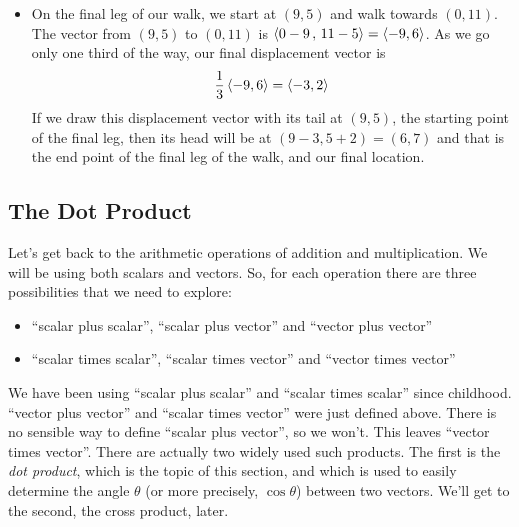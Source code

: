\begin{eg}
\begin{itemize}
$\sqrt{1^2+1^2}=\sqrt{2}$ and so $\frac{\llt 1,1\rgt}{\sqrt{2}}$ has length one
and our displacement vector is
\begin{equation*}
5\sqrt{2}\ \frac{\llt 1,1\rgt}{\sqrt{2}}
=5 \llt 1,1\rgt 
=\llt 5,5\rgt
\end{equation*}
If we draw this displacement vector, $\llt 5,5\rgt$ with its tail at 
$(4,0)$, the starting point of the second leg of the walk, then its head 
will be at $(4+5, 0+5)=(9,5)$ and that is the end point of the second 
leg of the walk.
\item
On the final leg of our walk, we start at $(9,5)$ and walk towards $(0,11)$.
The vector from $(9,5)$ to $(0,11)$ is $\left< 0-9\,,\,11-5\right> =\left< -9,6\right>$.
As we go only one third of the way, our final displacement vector is
\begin{equation*}
\frac{1}{3}\left< -9,6\right>
=\left< -3,2\right>
\end{equation*}
If we draw this displacement vector with its tail at 
$(9,5)$, the starting point of the final leg, then its head 
will be at $(9-3, 5+2)=(6,7)$ and that is the end point of the final
leg of the walk, and our final location.
\end{itemize}
\end{eg}

\subsection{The Dot Product}\label{subsec dot product}
Let's get back to the arithmetic operations of addition and multiplication.
We will be using both scalars and vectors. So, for each operation there are 
three possibilities that we need to explore: 
\begin{itemize}\itemsep1pt \parskip0pt 
\item ``scalar plus scalar'', ``scalar plus vector'' and ``vector plus vector''
\item``scalar times scalar'', ``scalar times vector'' and 
         ``vector times vector''
\end{itemize}
We have been using ``scalar plus scalar'' and ``scalar times scalar''
since childhood. ``vector plus vector'' and ``scalar times vector''
were just defined above. There is no sensible way to define ``scalar plus vector'', so we won't. This leaves ``vector times vector''. 
There are actually two widely used such products.
The first is the \emph{dot product}, which is the topic of this section,
and which is used to easily determine the angle $\theta$ (or more precisely,
$\cos\theta$) between two vectors.
We'll get to the second, the cross product, later. 

